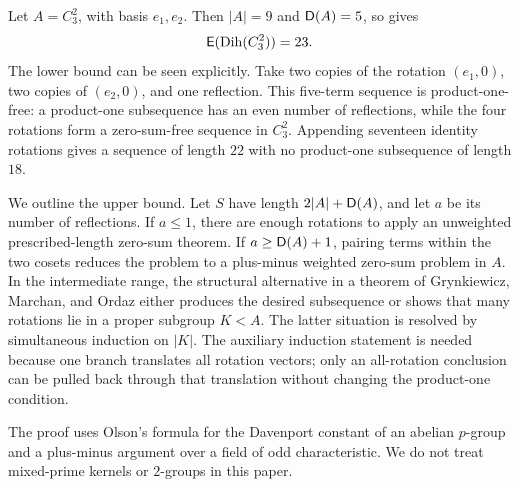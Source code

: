 \begin{example}\label{ex:C3square}
Let \(A=C_3^2\), with basis \(e_1,e_2\). Then \(|A|=9\) and
\(\mathsf D(A)=5\), so  gives
\[
  \mathsf E(\operatorname{Dih}(C_3^2))=23.
\]
The lower bound can be seen explicitly. Take two copies of the rotation
\((e_1,0)\), two copies of \((e_2,0)\), and one reflection. This
five-term sequence is product-one-free: a product-one subsequence has an
even number of reflections, while the four rotations form a zero-sum-free
sequence in \(C_3^2\). Appending seventeen identity rotations gives a
sequence of length \(22\) with no product-one subsequence of length
\(18\).
\end{example}

We outline the upper bound. Let \(S\) have length
\(2|A|+\mathsf D(A)\), and let \(a\) be its number of reflections. If
\(a\le 1\), there are enough rotations to apply an unweighted
prescribed-length zero-sum theorem. If \(a\ge \mathsf D(A)+1\), pairing terms
within the two cosets reduces the problem to a plus-minus weighted
zero-sum problem in \(A\). In the intermediate range, the structural
alternative in a theorem of Grynkiewicz, Marchan, and Ordaz
\cite{GrynkiewiczMarchanOrdaz2012} either produces the desired
subsequence or shows that many rotations lie in a proper subgroup
\(K<A\). The latter situation is resolved by simultaneous induction on
\(|K|\). The auxiliary induction statement is needed because one branch
translates all rotation vectors; only an all-rotation conclusion can be
pulled back through that translation without changing the product-one
condition.

The proof uses Olson's formula for the Davenport constant of an abelian
\(p\)-group and a plus-minus argument over a field of odd
characteristic. We do not treat mixed-prime kernels or \(2\)-groups in
this paper.
